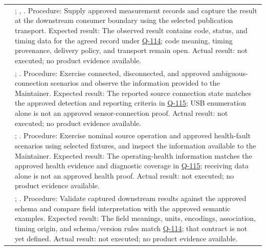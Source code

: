 \begin{tabularx}{\linewidth}{L{2cm}Y}
 & ; , . Procedure: Supply approved measurement records and capture the result at the downstream consumer boundary using the selected publication transport. Expected result: The observed result contains code, status, and timing data for the agreed record under \hyperref[Question:Q-114]{Q-114}; code meaning, timing provenance, delivery policy, and transport remain open. Actual result: not executed; no product evidence available.\\
 & ; . Procedure: Exercise connected, disconnected, and approved ambiguous-connection scenarios and observe the information provided to the Maintainer. Expected result: The reported source connection state matches the approved detection and reporting criteria in \hyperref[Question:Q-115]{Q-115}; USB enumeration alone is not an approved sensor-connection proof. Actual result: not executed; no product evidence available.\\
 & ; . Procedure: Exercise nominal source operation and approved health-fault scenarios using selected fixtures, and inspect the information available to the Maintainer. Expected result: The operating-health information matches the approved health evidence and diagnostic coverage in \hyperref[Question:Q-115]{Q-115}; receiving data alone is not an approved health proof. Actual result: not executed; no product evidence available.\\
 & ; . Procedure: Validate captured downstream results against the approved schema and compare field interpretation with the approved semantic examples. Expected result: The field meanings, units, encodings, association, timing origin, and schema/version rules match \hyperref[Question:Q-114]{Q-114}; that contract is not yet defined. Actual result: not executed; no product evidence available.\\
\end{tabularx}
\normalsize
